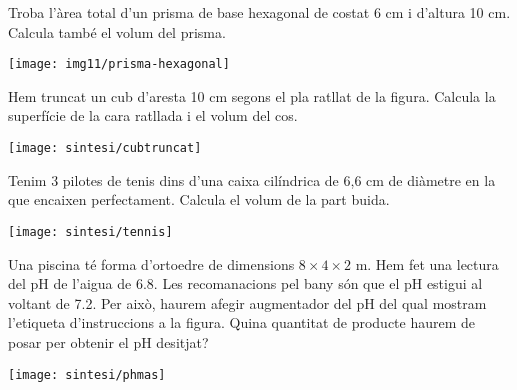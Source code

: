 \begin{mylist}
\vspace{-1.5cm}
\exer[2]\begin{minipage}[t]{0.7\textwidth}
Troba l'àrea total d'un prisma de base hexagonal de costat 6 cm i d'altura 10 cm. Calcula també el volum del prisma.
\end{minipage}
\begin{minipage}{0.3\textwidth}
	\centering
	\vspace{1.5cm}
	\texttt{[image: img11/prisma-hexagonal]}
\end{minipage}
 
 
\vspace*{-1.5cm}
\exer[2]\begin{minipage}[t]{0.7\textwidth}
	 Hem truncat un cub d'aresta 10 cm segons el pla ratllat de la figura. Calcula la superfície de la cara ratllada i el volum del cos.
\end{minipage}
\begin{minipage}{0.3\textwidth}
	\centering
	\vspace{1.5cm}
	\texttt{[image: sintesi/cubtruncat]}
\end{minipage}
	
	
	
\exer[2] Tenim 3 pilotes de tenis dins d'una caixa cilíndrica de 6,6 cm de diàmetre en la que encaixen perfectament. Calcula el volum de la part buida.
\begin{center}
	\texttt{[image: sintesi/tennis]}
\end{center}	

\exer[2] Una piscina té forma d'ortoedre de dimensions $8\times 4 \times 2 $ m. Hem fet una lectura del pH de l'aigua de 6.8. Les recomanacions pel bany són que el pH estigui al voltant de 7.2. Per això, haurem afegir augmentador del pH del qual mostram l'etiqueta d'instruccions a la figura. Quina quantitat de producte haurem de posar per obtenir el pH desitjat?   
\begin{center}
	\texttt{[image: sintesi/phmas]}
\end{center}	


 \end{mylist}

	
 
	